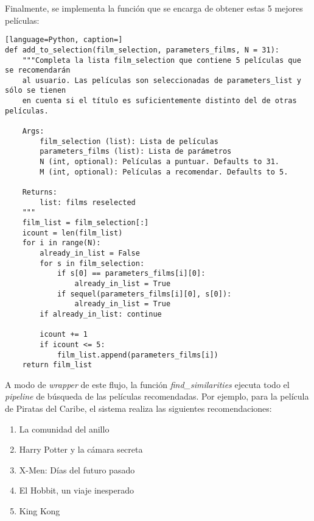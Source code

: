 Finalmente, se implementa la función que se encarga de obtener estas 5 mejores películas:

\begin{lstlisting}[language=Python, caption=]
def add_to_selection(film_selection, parameters_films, N = 31):
    """Completa la lista film_selection que contiene 5 películas que se recomendarán
    al usuario. Las películas son seleccionadas de parameters_list y sólo se tienen
    en cuenta si el título es suficientemente distinto del de otras películas.

    Args:
        film_selection (list): Lista de películas
        parameters_films (list): Lista de parámetros
        N (int, optional): Películas a puntuar. Defaults to 31.
        M (int, optional): Películas a recomendar. Defaults to 5.

    Returns:
        list: films reselected
    """
    film_list = film_selection[:]
    icount = len(film_list)    
    for i in range(N):
        already_in_list = False
        for s in film_selection:
            if s[0] == parameters_films[i][0]: 
                already_in_list = True
            if sequel(parameters_films[i][0], s[0]): 
                already_in_list = True            
        if already_in_list: continue
            
        icount += 1
        if icount <= 5:
            film_list.append(parameters_films[i])
    return film_list
\end{lstlisting}

A modo de \textit{wrapper} de este flujo, la función \textit{find\_similarities} ejecuta todo el \textit{pipeline} de búsqueda de las películas recomendadas. Por ejemplo, para la película de Piratas del Caribe, el sistema realiza las siguientes recomendaciones:

\begin{enumerate}
    \item La comunidad del anillo
    \item Harry Potter y la cámara secreta
    \item X-Men: Días del futuro pasado
    \item El Hobbit, un viaje inesperado
    \item King Kong
\end{enumerate}

